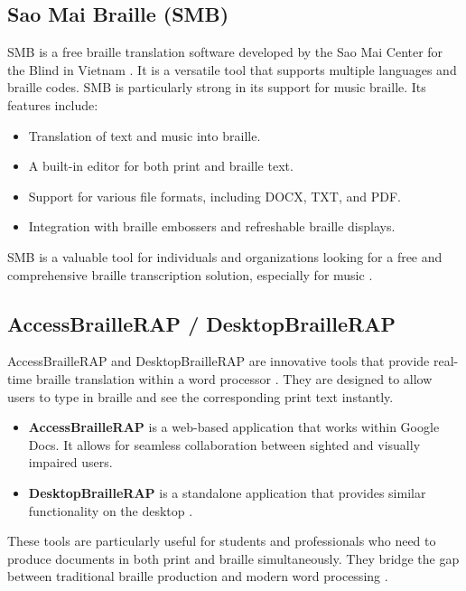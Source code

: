 \subsection{Sao Mai Braille (SMB)}\label{ch12:ssec:smb}
SMB is a free braille translation software developed by the Sao Mai Center for the Blind in Vietnam \supercite{SaoMaiBraille, SMBHomepage}. It is a versatile tool that supports multiple languages and braille codes. SMB is particularly strong in its support for music braille. Its features include:
\begin{itemize}
	\item Translation of text and music into braille.
	\item A built-in editor for both print and \gls{braille} text.
	\item Support for various file formats, including DOCX, TXT, and PDF.
	\item Integration with braille embossers and refreshable braille displays.
\end{itemize}
SMB is a valuable tool for individuals and organizations looking for a free and comprehensive braille transcription solution, especially for \gls{music} \supercite{SMBNVDA}.

\subsection{AccessBrailleRAP / DesktopBrailleRAP}\label{ch12:ssec:braillerap}
AccessBrailleRAP and DesktopBrailleRAP are innovative tools that provide real-time braille translation within a word processor \supercite{AccessBrailleRAP, BrailleRAPAccess}. They are designed to allow users to type in braille and see the corresponding print text instantly.
\begin{itemize}
	\item \textbf{AccessBrailleRAP} is a web-based application that works within Google Docs. It allows for seamless collaboration between sighted and visually impaired users.
	\item \textbf{DesktopBrailleRAP} is a standalone application that provides similar functionality on the desktop \supercite{BrailleRAPDesktop, BrailleRAPGit}.
\end{itemize}
These tools are particularly useful for students and professionals who need to produce documents in both print and braille simultaneously. They bridge the gap between traditional braille production and modern word processing \supercite{BrailleRAPOfficial}.

